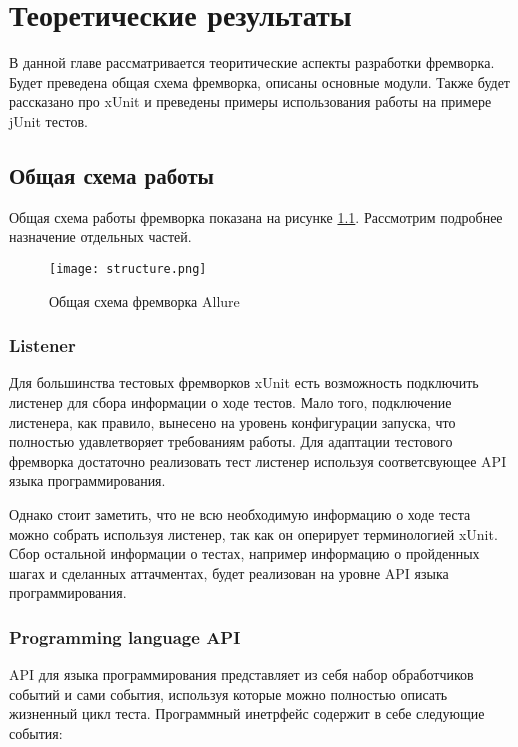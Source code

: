 \chapter{Теоретические результаты}
\label{chapter2}

В данной главе рассматривается теоритические аспекты разработки фремворка. Будет преведена общая схема фремворка, описаны основные модули. Также будет рассказано про xUnit и преведены примеры использования работы на примере jUnit тестов. 

\section{Общая схема работы} 

Общая схема работы фремворка показана на рисунке \ref{fig:allure}. Рассмотрим подробнее назначение отдельных частей.

\begin{figure}[htb]
\centering
\texttt{[image: structure.png]}
\caption{Общая схема фремворка Allure}
\label{fig:allure}
\end{figure}

\subsection{Listener}

Для большинства тестовых фремворков xUnit есть возможность подключить листенер для сбора информации о ходе тестов. Мало того, подключение листенера, как правило, вынесено на уровень конфигурации запуска, что полностью удавлетворяет требованиям работы. Для адаптации тестового фремворка достаточно реализовать тест листенер используя соответсвующее API языка программирования.

Однако стоит заметить, что не всю необходимую информацию о ходе теста можно собрать используя листенер, так как он оперирует терминологией xUnit. Сбор остальной информации о тестах, например информацию о пройденных шагах и сделанных аттачментах, будет реализован на уровне API языка программирования.

\subsection{Programming language API}

API для языка программирования представляет из себя набор обработчиков событий и сами события, используя которые можно полностью описать жизненный цикл теста. Программный инетрфейс содержит в себе следующие события:


